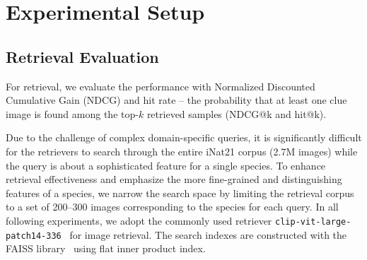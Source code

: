 \section{Experimental Setup}
\label{sec:exp}

\subsection{Retrieval Evaluation}
\label{sec:eval_ret}
For retrieval, we evaluate the performance with Normalized Discounted Cumulative Gain (NDCG) and hit rate -- the probability that at least one clue image is found among the top-$k$ retrieved samples (NDCG@k and hit@k). %


Due to the challenge of complex domain-specific queries, it is significantly difficult for the retrievers to search through the entire iNat21 corpus (2.7M images) while the query is about a sophisticated feature for a single species. To enhance retrieval effectiveness and emphasize the more fine-grained and distinguishing features of a species, we narrow the search space by limiting the retrieval corpus to a set of 200–300 images corresponding to the species for each query.
In all following experiments, we adopt the commonly used retriever \verb|clip-vit-large-patch14-336|~\citep{pmlr-v139-radford21a} for image retrieval. The search indexes are constructed with the FAISS library~\citep{douze2024faisslibrary} using flat inner product index.


